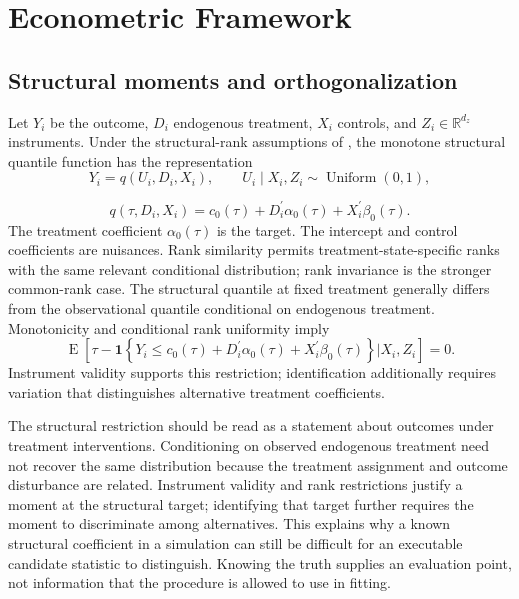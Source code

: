 \section{Econometric Framework}
\label{sec:framework}
\subsection{Structural moments and orthogonalization}
Let $Y_i$ be the outcome, $D_i$ endogenous treatment, $X_i$ controls, and $Z_i\in\mathbb R^{d_z}$ instruments. Under the structural-rank assumptions of \textcite{chernozhukov_hansen_2005}, the monotone structural quantile function has the representation
\begin{equation}
    Y_i = q(U_i,D_i,X_i),
    \qquad
    U_i \mid X_i,Z_i \sim \operatorname{Uniform}(0,1),
    \label{eq:structural-ivqr}
\end{equation}

\begin{equation}
    q(\tau,D_i,X_i)
    = c_0(\tau)
      + D_i^{\prime}\alpha_0(\tau)
      + X_i^{\prime}\beta_0(\tau).
    \label{eq:linear-structural-quantile}
\end{equation}
The treatment coefficient $\alpha_0(\tau)$ is the target. The intercept and control coefficients are nuisances. Rank similarity permits treatment-state-specific ranks with the same relevant conditional distribution; rank invariance is the stronger common-rank case. The structural quantile at fixed treatment generally differs from the observational quantile conditional on endogenous treatment. Monotonicity and conditional rank uniformity imply
\begin{equation}
    \operatorname{E}\!\left[
        \tau
        - \mathbf{1}\!\left\{
            Y_i \leq c_0(\tau)
            + D_i^{\prime}\alpha_0(\tau)
            + X_i^{\prime}\beta_0(\tau)
        \right\}
        \mathrel{\big|} X_i,Z_i
    \right]
    = 0.
    \label{eq:ivqr-conditional-moment}
\end{equation}
Instrument validity supports this restriction; identification additionally requires variation that distinguishes alternative treatment coefficients.

The structural restriction should be read as a statement about outcomes under treatment interventions. Conditioning on observed endogenous treatment need not recover the same distribution because the treatment assignment and outcome disturbance are related. Instrument validity and rank restrictions justify a moment at the structural target; identifying that target further requires the moment to discriminate among alternatives. This explains why a known structural coefficient in a simulation can still be difficult for an executable candidate statistic to distinguish. Knowing the truth supplies an evaluation point, not information that the procedure is allowed to use in fitting.

